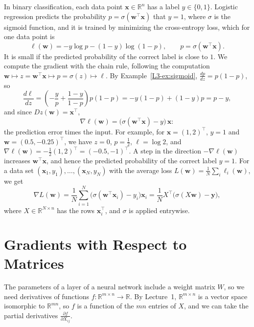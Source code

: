 \begin{example}\label{L3-ex:logistic}
    In binary classification, each data point $\mathbf{x} \in \mathbb{R}^n$ has a label $y \in \{0, 1\}$. Logistic regression predicts the probability $p = \sigma(\mathbf{w}^\top \mathbf{x})$ that $y = 1$, where $\sigma$ is the sigmoid function, and it is trained by minimizing the cross-entropy loss, which for one data point is
    \[\ell(\mathbf{w}) = -y \log p - (1 - y) \log(1 - p), \qquad p = \sigma(\mathbf{w}^\top \mathbf{x}).\]
    It is small if the predicted probability of the correct label is close to $1$. We compute the gradient with the chain rule, following the computation $\mathbf{w} \mapsto z = \mathbf{w}^\top \mathbf{x} \mapsto p = \sigma(z) \mapsto \ell$. By Example~\ref{L3-ex:sigmoid}, $\frac{dp}{dz} = p(1 - p)$, so
    \[\frac{d\ell}{dz} = \left(-\frac{y}{p} + \frac{1 - y}{1 - p}\right) p(1 - p) = -y(1 - p) + (1 - y)p = p - y,\]
    and since $Dz(\mathbf{w}) = \mathbf{x}^\top$,
    \[\nabla \ell(\mathbf{w}) = \big(\sigma(\mathbf{w}^\top\mathbf{x}) - y\big) \, \mathbf{x}:\]
    the prediction error times the input. For example, for $\mathbf{x} = (1, 2)^\top$, $y = 1$ and $\mathbf{w} = (0.5, -0.25)^\top$, we have $z = 0$, $p = \frac{1}{2}$, $\ell = \log 2$, and $\nabla \ell(\mathbf{w}) = -\frac{1}{2}(1, 2)^\top = (-0.5, -1)^\top$. A step in the direction $-\nabla\ell(\mathbf{w})$ increases $\mathbf{w}^\top\mathbf{x}$, and hence the predicted probability of the correct label $y = 1$. For a data set $(\mathbf{x}_1, y_1), \ldots, (\mathbf{x}_N, y_N)$ with the average loss $L(\mathbf{w}) = \frac{1}{N}\sum_i \ell_i(\mathbf{w})$, we get
    \[\nabla L(\mathbf{w}) = \frac{1}{N} \sum_{i=1}^N \big(\sigma(\mathbf{w}^\top\mathbf{x}_i) - y_i\big) \mathbf{x}_i = \frac{1}{N} X^\top \big(\sigma(X\mathbf{w}) - \mathbf{y}\big),\]
    where $X \in \mathbb{R}^{N \times n}$ has the rows $\mathbf{x}_i^\top$, and $\sigma$ is applied entrywise.
\end{example}

\section{Gradients with Respect to Matrices}\label{L3-sec:matrix-gradients}

The parameters of a layer of a neural network include a weight matrix $W$, so we need derivatives of functions $f: \mathbb{R}^{m \times n} \to \mathbb{R}$. By Lecture~1, $\mathbb{R}^{m \times n}$ is a vector space isomorphic to $\mathbb{R}^{mn}$, so $f$ is a function of the $mn$ entries of $X$, and we can take the partial derivatives $\frac{\partial f}{\partial X_{ij}}$.

